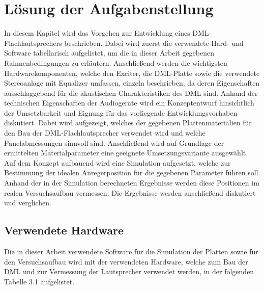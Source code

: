 \chapter{Lösung der Aufgabenstellung}

In diesem Kapitel wird das Vorgehen zur Entwicklung eines DML-Flachlautsprechers beschrieben. Dabei wird zuerst die verwendete Hard- und Software tabellarisch aufgelistet, um die in dieser Arbeit gegebenen Rahmenbedingungen zu erläutern. Anschließend werden die wichtigsten Hardwarekomponenten, welche den Exciter, die DML-Platte sowie die verwendete Stereoanlage mit Equalizer umfassen, einzeln beschrieben, da deren Eigenschaften ausschlaggebend für die akustischen Charakteristiken des DML sind. Anhand der technischen Eigenschaften der Audiogeräte wird ein Konzeptentwurf hinsichtlich der Umsetzbarkeit und Eignung für das vorliegende Entwicklungsvorhaben diskutiert. Dabei wird aufgezeigt, welches der gegebenen Plattenmaterialien für den Bau der DML-Flachlautsprecher verwendet wird und welche Panelabmessungen sinnvoll sind. Anschließend wird auf Grundlage der ermittelten Materialparameter eine geeignete Umsetzungsvariante ausgewählt.
Auf dem Konzept aufbauend wird eine Simulation aufgesetzt, welche zur Bestimmung der idealen Anregerposition für die gegebenen Parameter führen soll. Anhand der in der Simulation berechneten Ergebnisse werden diese Positionen im realen Versuchsaufbau vermessen. Die Ergebnisse werden anschließend diskutiert und verglichen.


\section{Verwendete Hardware}

Die in dieser Arbeit verwendete Software für die Simulation der Platten sowie für den Versuchsaufbau wird mit der verwendeten Hardware, welche zum Bau der DML und zur Vermessung der Lautsprecher verwendet werden, in der folgenden Tabelle 3.1 aufgelistet.


